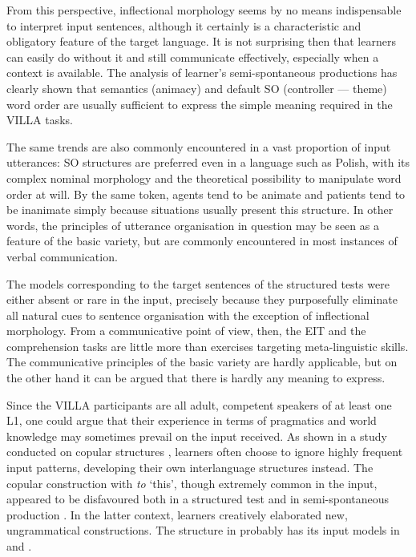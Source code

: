 From this perspective, inflectional morphology seems by no means indispensable to interpret input sentences, although it certainly is a characteristic and obligatory feature of the target language. It is not surprising then that learners can easily do without it and still communicate effectively, especially when a context is available. The analysis of learner’s semi-spontaneous productions has clearly shown that semantics (animacy) and default SO (controller — theme) word order are usually sufficient to express the simple meaning required in the VILLA tasks. 

The same trends are also commonly encountered in a vast proportion of input utterances: SO structures are preferred even in a language such as Polish, with its complex nominal morphology and the theoretical possibility to manipulate word order at will. By the same token, agents tend to be animate and patients tend to be inanimate simply because situations usually present this structure. In other words, the principles of utterance organisation in question may be seen as a feature of the basic variety, but are commonly encountered in most instances of verbal communication.

The models corresponding to the target sentences of the structured tests were either absent or rare in the input, precisely because they purposefully eliminate all natural cues to sentence organisation with the exception of inflectional morphology. From a communicative point of view, then, the EIT and the comprehension tasks are little more than exercises targeting meta-linguistic skills. The communicative principles of the basic variety are hardly applicable, but on the other hand it can be argued that there is hardly any meaning to express. 

Since the VILLA participants are all adult, competent speakers of at least one L1, one could argue that their experience in terms of pragmatics and world knowledge may sometimes prevail on the input received. As shown in a study conducted on copular structures \citep{Saturno2015}, learners often choose to ignore highly frequent input patterns, developing their own interlanguage structures instead. The copular construction with \textit{to} ‘this’, though extremely common in the input, appeared to be disfavoured both in a structured test and in semi-spon\-ta\-ne\-ous production \citep{Saturno2018}. In the latter context, learners creatively elaborated new, ungrammatical constructions. The structure in  probably has its input models in  and .

